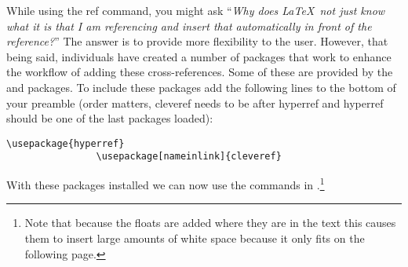 			While using the ref command, you might ask \enquote{\textit{Why does \LaTeX\ not just know what it is that I am referencing and insert that automatically in front of the reference?}}
			The answer is to provide more flexibility to the user.
			However, that being said, individuals have created a number of packages that work to enhance the workflow of adding these cross-references.
			Some of these are provided by the  and  packages.
			To include these packages add the following lines to the bottom of your preamble (order matters, cleveref needs to be after hyperref and hyperref should be one of the last packages loaded):
			\begin{lstlisting}[style=LaTeXStyle]
				\usepackage{hyperref}
				\usepackage[nameinlink]{cleveref}
			\end{lstlisting}
			With these packages installed we can now use the commands in .\footnote{Note that because the floats are added where they are in the text this causes them to insert large amounts of white space because it only fits on the following page.}
